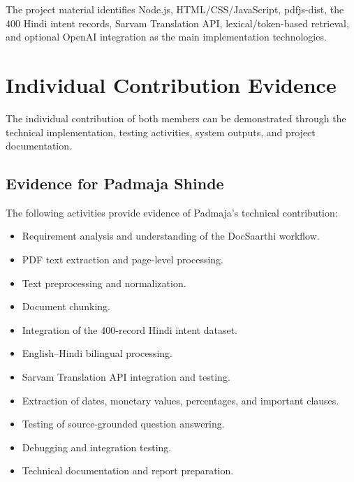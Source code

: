 The project material identifies Node.js, HTML/CSS/JavaScript,
pdfjs-dist, the 400 Hindi intent records, Sarvam Translation API,
lexical/token-based retrieval, and optional OpenAI integration as the
main implementation technologies.

\section{Individual Contribution Evidence}

The individual contribution of both members can be demonstrated
through the technical implementation, testing activities, system
outputs, and project documentation.

\subsection{Evidence for Padmaja Shinde}

The following activities provide evidence of Padmaja's technical
contribution:

\begin{itemize}

    \item Requirement analysis and understanding of the DocSaarthi
    workflow.

    \item PDF text extraction and page-level processing.

    \item Text preprocessing and normalization.

    \item Document chunking.

    \item Integration of the 400-record Hindi intent dataset.

    \item English--Hindi bilingual processing.

    \item Sarvam Translation API integration and testing.

    \item Extraction of dates, monetary values, percentages, and
    important clauses.

    \item Testing of source-grounded question answering.

    \item Debugging and integration testing.

    \item Technical documentation and report preparation.

\end{itemize}

